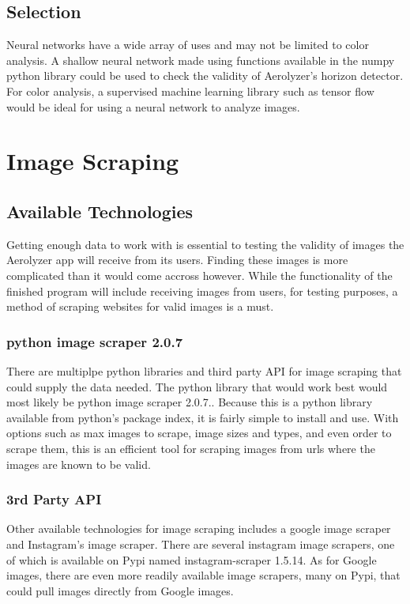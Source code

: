 \documentclass[onecolumn, draftclsnofoot,10pt, compsoc]{IEEEtran}
\begin{document}
\begin{singlespace}
\subsection{Selection}
Neural networks have a wide array of uses and may not be limited to color analysis. A shallow neural network made using functions available in the numpy python library could be used to check the validity of Aerolyzer's horizon detector. For color analysis, a supervised machine learning library such as tensor flow would be ideal for using a neural network to analyze images. 


\section{Image Scraping}
\subsection{Available Technologies}
Getting enough data to work with is essential to testing the validity of images the Aerolyzer app will receive from its users. Finding these images is more complicated than it would come accross however. While the functionality of the finished program will include receiving images from users, for testing purposes, a method of scraping websites for valid images is a must. \cite{img}

\subsubsection{python image scraper 2.0.7}
There are multiplpe python libraries and third party API for image scraping that could supply the data needed. The python library that would work best would most likely be python image scraper 2.0.7.. Because this is a python library available from python's package index, it is fairly simple to install and use. With options such as max images to scrape, image sizes and types, and even order to scrape them, this is an efficient tool for scraping images from urls where the images are known to be valid.\cite{img}

\subsubsection{3rd Party API}
Other available technologies for image scraping includes a google image scraper and Instagram's image scraper. There are several instagram image scrapers, one of which is available on Pypi named instagram-scraper 1.5.14. As for Google images, there are even more readily available image scrapers, many on Pypi, that could pull images directly from Google images.\cite{img2}


\end{singlespace}
\end{document}

